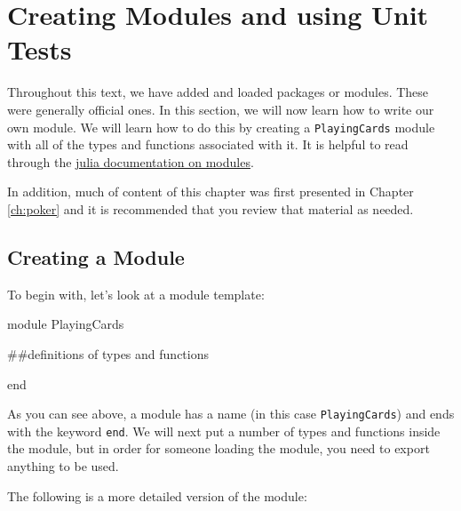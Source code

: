 


\chapter{Creating Modules and using Unit Tests} \label{ch:modules}

Throughout this text, we have added and loaded packages or modules. These were generally official ones. In this section, we will now learn how to write our own module. We will learn how to do this by creating a \texttt{PlayingCards} module with all of the types and functions associated with it. It is helpful to read through the \href{http://docs.julialang.org/en/latest/manual/modules/}{julia documentation on modules}.

In addition, much of content of this chapter was first presented in Chapter \ref{ch:poker} and it is recommended that you review that material as needed.  

\section{Creating a Module}

To begin with, let's look at a module template:

\begin{jlverbatim}
module PlayingCards

##definitions of types and functions

end
\end{jlverbatim}

As you can see above, a module has a name (in this case
\texttt{PlayingCards}) and ends with the keyword \texttt{end}. We will
next put a number of types and functions inside the module, but in order
for someone loading the module, you need to export anything to be used.

The following is a more detailed version of the module:



